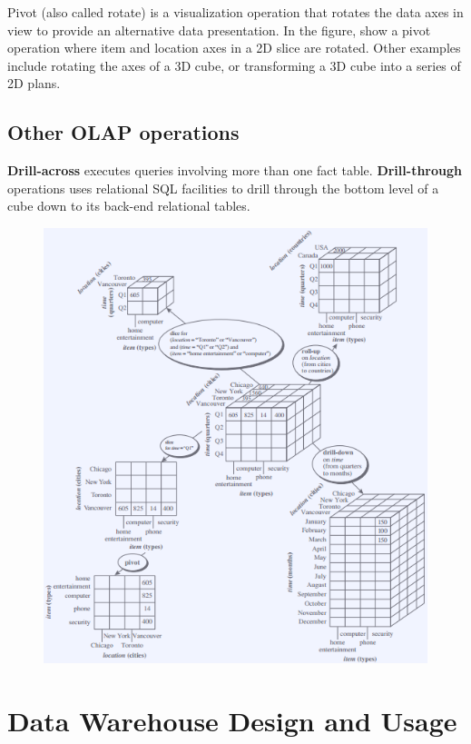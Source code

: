 			Pivot (also called rotate) is a visualization operation that rotates the data
			axes in view to provide an alternative data presentation. In the figure, show
			a pivot operation where item and location axes in a 2D slice are rotated. 
			Other examples include rotating the axes of a 3D cube, or transforming a 
			3D cube into a series of 2D plans. 

		\subsection*{Other OLAP operations}

			{\bf Drill-across} executes queries involving more than one fact table. 
			{\bf Drill-through} operations uses relational SQL facilities to drill
			through the bottom level of a cube down to its back-end relational tables. 

		\begin{figure}[H]	
			\includegraphics[width=\textwidth]{pics/operations.png}
		\end{figure}

\clearpage
\section{Data Warehouse Design and Usage}

